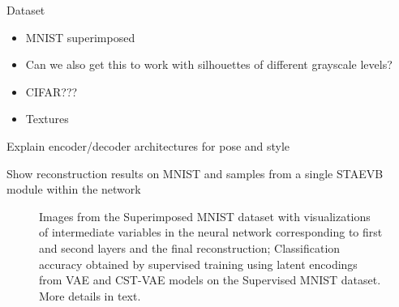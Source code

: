 Dataset
\begin{itemize}
\item MNIST superimposed
\item Can we also get this to work with silhouettes of different grayscale levels?
\item CIFAR???
\item Textures
\end{itemize}


Explain encoder/decoder architectures for pose and style

Show reconstruction results on MNIST and samples from a single STAEVB module within the network



\begin{figure}[t]
\begin{center}
\qquad\qquad
{}
\end{center}
 \caption{
   Images from the Superimposed MNIST dataset with visualizations of
 intermediate variables in the neural network corresponding to first and second layers and the final reconstruction;
 Classification accuracy obtained by supervised training using latent encodings
 from VAE and CST-VAE models on the Supervised MNIST dataset.  More details in text.
 }
\end{figure}




